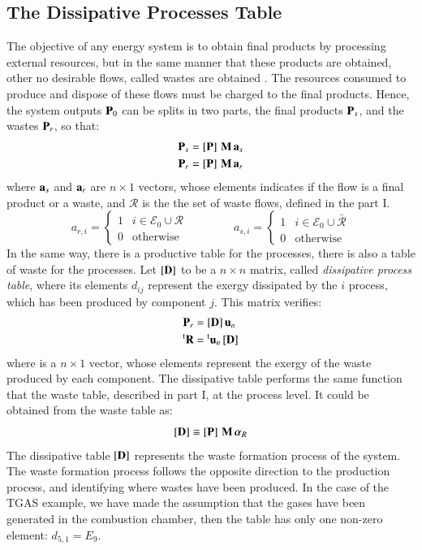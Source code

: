 \documentclass{ecos2018}
\begin{document}
\subsection{The Dissipative Processes Table}
The objective of any energy system is to obtain final products by processing external resources, but in the same manner that these products are obtained, other no desirable flows, called wastes are obtained \cite{Residues2007}. The resources consumed to produce and dispose of these flows must be charged to the final products. Hence, the system outputs $\mathbf{P}_0$ can be splits in two parts, the final products $\mathbf{P}_s$, and the wastes $\mathbf{P}_r$, so that:
\begin{align}
\mathbf{P}_s&=\left[ \textbf{P} \right]\,\mathbf{M}\,\mathbf{a}_s \\
\mathbf{P}_r&=\left[ \textbf{P} \right]\,\mathbf{M}\,\mathbf{a}_r
\end{align}
where $\mathbf{a}_s$ and $\mathbf{a}_r$ are $n \times 1$ vectors, whose elements indicates if the flow is a final product or a waste, and $\mathcal{R}$ is the the set of waste flows, defined in the part I.
\begin{equation}
a_{r,i}=\begin{cases}
1 & i\in\mathcal{E}_0 \cup \mathcal{R} \\
0 & \text{otherwise}
\end{cases}
\qquad\qquad
a_{s,i}=\begin{cases}
1 & i\in\mathcal{E}_0 \cup \bar{\mathcal{R}} \\
0 & \text{otherwise}
\end{cases}
\end{equation}
In the same way, there is a productive table for the processes, there is also a table of waste for the processes. Let $\left[ \textbf{D} \right]$ to be a $n \times n$ matrix, called \emph{dissipative process table}, where its elements $d_{ij}$ represent the exergy dissipated by the $i$ process, which has been produced by component $j$. This matrix verifies:
\begin {align}
\mathbf{P} _r & = \left[ \textbf{D} \right] \mathbf{u} _n \\
\prescript{\smash{\mathrm{t}}}{}{\mathbf{R}} & = \prescript{\smash{\mathrm{t}}}{}{\mathbf{u}} _n \left[ \textbf{D} \right]
\end {align}
where  is a $n \times 1$ vector, whose elements represent the exergy of the waste produced by each component. The dissipative table performs the same function that the waste table, described in part I, at the process level. It could be obtained from the waste table as:
\begin{equation}
\label{eq:rctfpdd}
\left[ \textbf{D} \right] \equiv \left[ \textbf{P} \right] \, \mathbf{M} \, \bm{\alpha}_R
\end{equation}
The dissipative table $\left[ \textbf{D} \right]$ represents the waste formation process of the system. The waste formation process follows the opposite direction to the production process, and  identifying where wastes have been produced. In the case of the TGAS example, we have made the assumption that the gases have been generated in the combustion chamber, then the table has only one non-zero element: $d_{5,1}= E_9$.
\end{document}
